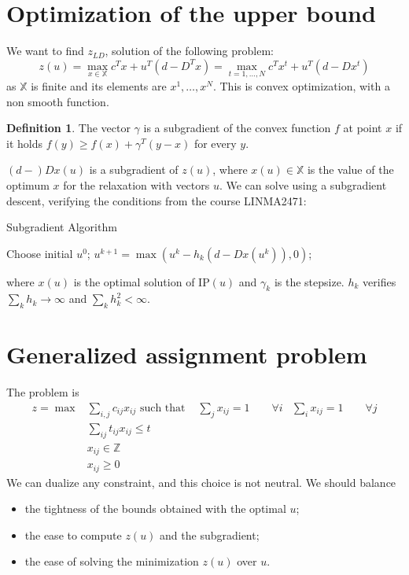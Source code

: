 \documentclass[11pt, openany]{report}
\theoremstyle{definition}
\newtheorem{definition}[thm]{Definition}
\begin{document}
\section{Optimization of the upper bound}
We want to find $z_{LD}$, solution of the following problem:
\begin{equation}
    z(u) = \max_{x\in \mathbb{X}} c^Tx + u^T(d-D^Tx) = \max_{t=1,\dots,N} c^Tx^t + u^T (d-Dx^t)
\end{equation}
as $\mathbb{X}$ is finite and its elements are $x^1,\dots, x^N$. This is convex optimization, with a non smooth function. 
\begin{definition}
    The vector $\gamma$ is a subgradient of the convex function $f$ at point $x$ if it holds $f(y) \ge f(x)+\gamma^T(y-x)$ for every $y$. 
\end{definition}
$(d-)Dx(u)$ is a subgradient of $z(u)$, where $x(u)\in \mathbb{X}$ is the value of the optimum $x$ for the relaxation with vectors $u$. We can solve using a subgradient descent, verifying the conditions from the course LINMA2471:
\begin{algorithm}[H]
    \caption{Subgradient Algorithm}\label{algo:subgradient}
    \begin{algorithmic}[1]
        \State Choose initial $u^0$;
        \State $u^{k+1} = \max (u^k - h_k (d-Dx(u^k)),0)$;
        \EndFor
    \end{algorithmic}
\end{algorithm}
where $x(u)$ is the optimal solution of IP$(u)$ and $\gamma_k$ is the stepsize. $h_k$ verifies $\sum_k h_k \rightarrow \infty$ and $\sum_k h_k^2 < \infty $.
\section{Generalized assignment problem}
The problem is 
\begin{equation}
    \begin{aligned}
        z = \max &\sum_{i,j}c_{ij}x_{ij} 
        \text{ such that } &\sum_j x_{ij} = 1\qquad \forall i
        & \sum_i x_{ij} = 1\qquad \forall j\\
        &\sum_{ij}t_{ij}x_{ij} \le t\\
        &x_{ij}\in \mathbb{Z}\\
        &x_{ij}\ge 0
    \end{aligned}
\end{equation}
We can dualize any constraint, and this choice is not neutral. We should balance 
\begin{itemize}
    \item the tightness of the bounds obtained with the optimal $u$;
    \item the ease to compute $z(u)$ and the subgradient;
    \item the ease of solving the minimization $z(u)$ over $u$.
\end{itemize}
\end{document}
